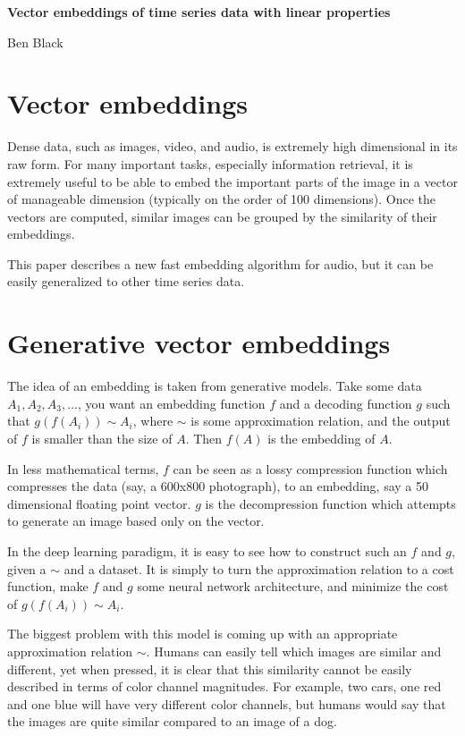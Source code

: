 \documentclass{article}
\begin{document}
	\hfill \textbf{Vector embeddings of time series data with linear properties}
	
	\hfill Ben Black
	
	\section{Vector embeddings}
	
	Dense data, such as images, video, and audio, is extremely high dimensional in its raw form. For many important tasks, especially information retrieval, it is extremely useful to be able to embed the important parts of the image in a vector of manageable dimension (typically on the order of 100 dimensions). Once the vectors are computed, similar images can be grouped by the similarity of their embeddings.
	
	This paper describes a new fast embedding algorithm for audio, but it can be easily generalized to other time series data. 
	
	\section{Generative vector embeddings}
	
	The idea of an embedding is taken from generative models. Take some data $A_1,A_2,A_3,...$, you want an embedding function $f$ and a decoding function $g$ such that $g(f(A_i)) \sim A_i$, where $\sim$ is some approximation relation, and the output of $f$ is smaller than the size of $A$. Then $f(A)$ is the embedding of $A$.
	
	In less mathematical terms, $f$ can be seen as a lossy compression function which compresses the data (say, a 600x800 photograph), to an embedding, say a 50 dimensional floating point vector. $g$ is the decompression function which attempts to generate an image based only on the vector. 
	
	In the deep learning paradigm, it is easy to see how to construct such an $f$ and $g$, given a $\sim$ and a dataset. It is simply to turn the approximation relation to a cost function, make $f$ and $g$ some neural network architecture, and minimize the cost of $g(f(A_i)) \sim A_i$. 
	
	The biggest problem with this model is coming up with an appropriate approximation relation $\sim$. Humans can easily tell which images are similar and different, yet when pressed, it is clear that this similarity cannot be easily described in terms of color channel magnitudes. For example, two cars, one red and one blue will have very different color channels, but humans would say that the images are quite similar compared to an image of a dog.
	
\end{document}
